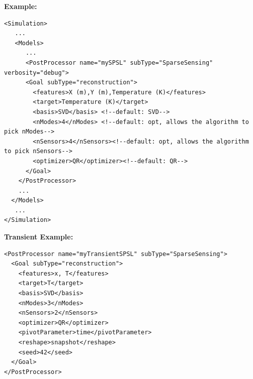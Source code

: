 \textbf{Example:}
\begin{lstlisting}[style=XML]
<Simulation>
   ...
   <Models>
      ...
      <PostProcessor name="mySPSL" subType="SparseSensing" verbosity="debug">
      <Goal subType="reconstruction">
        <features>X (m),Y (m),Temperature (K)</features>
        <target>Temperature (K)</target>
        <basis>SVD</basis> <!--default: SVD-->
        <nModes>4</nModes> <!--default: opt, allows the algorithm to pick nModes-->
        <nSensors>4</nSensors><!--default: opt, allows the algorithm to pick nSensors-->
        <optimizer>QR</optimizer><!--default: QR-->
      </Goal>
    </PostProcessor>
    ...
  </Models>
   ...
</Simulation>
\end{lstlisting}

\textbf{Transient Example:}
\begin{lstlisting}[style=XML]
<PostProcessor name="myTransientSPSL" subType="SparseSensing">
  <Goal subType="reconstruction">
    <features>x, T</features>
    <target>T</target>
    <basis>SVD</basis>
    <nModes>3</nModes>
    <nSensors>2</nSensors>
    <optimizer>QR</optimizer>
    <pivotParameter>time</pivotParameter>
    <reshape>snapshot</reshape>
    <seed>42</seed>
  </Goal>
</PostProcessor>
\end{lstlisting}
